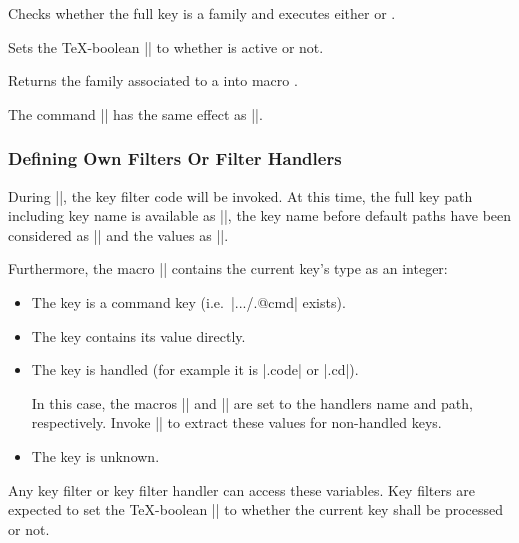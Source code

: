 \begin{command}{\pgfkeysiffamilydefined{}}%
    Checks whether the full key  is a family and executes either
     or .
\end{command}

\begin{command}{\pgfkeysisfamilyactive{}}
    Sets the \TeX-boolean |\ifpgfkeysfiltercontinue| to whether 
    is active or not.
\end{command}

\begin{command}{\pgfkeysgetfamily{}}
    Returns the family associated to a  into macro
    .
\end{command}

\begin{command}{\pgfkeyssetfamily{}}
    The command |\pgfkeyssetfamily| has the same
    effect as ||.
\end{command}


\subsubsection{Defining Own Filters Or Filter Handlers}
\label{section-key-writing-filters}

During |\pgfkeysfiltered|, the key filter code will be invoked. At this time,
the full key path including key name is available as |\pgfkeyscurrentkey|, the
key name before default paths have been considered as |\pgfkeyscurrentkeyRAW|
and the values as |\pgfkeyscurrentvalue|.

Furthermore, the macro |\pgfkeyscasenumber| contains the current key's type as
an integer:
%
\begin{itemize}
    \item[\meta{1}] The key is a command key (i.e.\ |.../.@cmd| exists).
    \item[\meta{2}] The key contains its value directly.
    \item[\meta{3}] The key is handled (for example it is |.code| or |.cd|).

        In this case, the macros |\pgfkeyscurrentname| and
        |\pgfkeyscurrentpath| are set to the handlers name and path,
        respectively. Invoke |\pgfkeyssplitpath{}| to extract these values for
        non-handled keys.
    \item[\meta{0}] The key is unknown.
\end{itemize}
%
Any key filter or key filter handler can access these variables. Key filters
are expected to set the \TeX-boolean |\ifpgfkeysfiltercontinue| to whether the
current key shall be processed or not.

